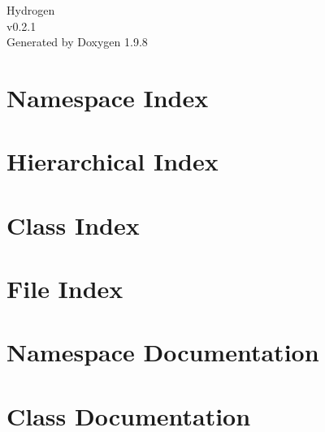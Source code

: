 \documentclass[twoside]{book}
\newcommand{\+}{\discretionary{\mbox{\scriptsize$\hookleftarrow$}}{}{}}
\newcommand{\clearemptydoublepage}{%
    \newpage{\pagestyle{empty}\cleardoublepage}%
  }
\begin{document}
  \raggedbottom
    \hypersetup{pageanchor=false,
                bookmarksnumbered=true,
                pdfencoding=unicode
               }
  \begin{titlepage}
  \vspace*{7cm}
  \begin{center}%
  {\Large Hydrogen}\\
  [1ex]\large v0.\+2.\+1 \\
  \vspace*{1cm}
  {\large Generated by Doxygen 1.9.8}\\
  \end{center}
  \end{titlepage}
  \clearemptydoublepage
  \tableofcontents
  \clearemptydoublepage
  \hypersetup{pageanchor=true}
\chapter{Namespace Index}

\chapter{Hierarchical Index}

\chapter{Class Index}

\chapter{File Index}

\chapter{Namespace Documentation}

\chapter{Class Documentation}


































\end{document}
